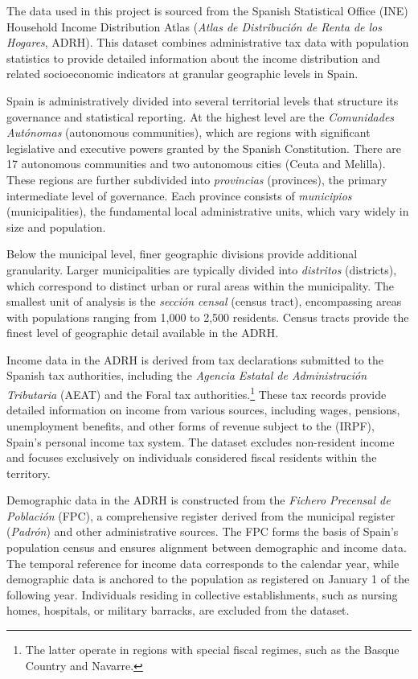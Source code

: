 
The data used in this project is sourced from the Spanish Statistical Office (INE) Household Income Distribution Atlas (\textit{Atlas de Distribución de Renta de los Hogares}, ADRH). This dataset combines administrative tax data with population statistics to provide detailed information about the income distribution and related socioeconomic indicators at granular geographic levels in Spain.

Spain is administratively divided into several territorial levels that structure its governance and statistical reporting. At the highest level are the \textit{Comunidades Autónomas} (autonomous communities), which are regions with significant legislative and executive powers granted by the Spanish Constitution. There are 17 autonomous communities and two autonomous cities (Ceuta and Melilla). These regions are further subdivided into \textit{provincias} (provinces), the primary intermediate level of governance. Each province consists of \textit{municipios} (municipalities), the fundamental local administrative units, which vary widely in size and population.

Below the municipal level, finer geographic divisions provide additional granularity. Larger municipalities are typically divided into \textit{distritos} (districts), which correspond to distinct urban or rural areas within the municipality. The smallest unit of analysis is the \textit{sección censal} (census tract), encompassing areas with populations ranging from 1,000 to 2,500 residents. Census tracts provide the finest level of geographic detail available in the ADRH.

Income data in the ADRH is derived from tax declarations submitted to the Spanish tax authorities, including the \textit{Agencia Estatal de Administración Tributaria} (AEAT) and the Foral tax authorities.\footnote{The latter operate in regions with special fiscal regimes, such as the Basque Country and Navarre.} These tax records provide detailed information on income from various sources, including wages, pensions, unemployment benefits, and other forms of revenue subject to the  (IRPF), Spain's personal income tax system. The dataset excludes non-resident income and focuses exclusively on individuals considered fiscal residents within the territory.

Demographic data in the ADRH is constructed from the \textit{Fichero Precensal de Población} (FPC), a comprehensive register derived from the municipal register (\textit{Padrón}) and other administrative sources. The FPC forms the basis of Spain’s population census and ensures alignment between demographic and income data. The temporal reference for income data corresponds to the calendar year, while demographic data is anchored to the population as registered on January 1 of the following year. Individuals residing in collective establishments, such as nursing homes, hospitals, or military barracks, are excluded from the dataset.

